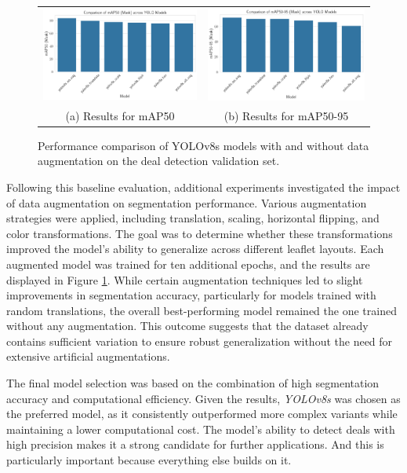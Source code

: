 \documentclass[11pt]{article}
\begin{document}
\begin{figure}[h!]
    \centering
    \begin{tabular}{cc}
    \includegraphics[width=0.5\linewidth]{figures/deal_detection/map50_yolo8.png} &   \includegraphics[width=0.5\linewidth]{figures/deal_detection/map50_95_yolo8.png} \\
    (a) Results for mAP50 & (b) Results for mAP50-95 \\[2pt]
    \end{tabular}
    \caption{Performance comparison of YOLOv8s models with and without data augmentation on the deal detection validation set.}
    \label{fig:yolo8_results}
\end{figure}

Following this baseline evaluation, additional experiments investigated the impact of data augmentation on segmentation performance. Various augmentation strategies were applied, including translation, scaling, horizontal flipping, and color transformations. The goal was to determine whether these transformations improved the model’s ability to generalize across different leaflet layouts. Each augmented model was trained for ten additional epochs, and the results are displayed in Figure \ref{fig:yolo8_results}. While certain augmentation techniques led to slight improvements in segmentation accuracy, particularly for models trained with random translations, the overall best-performing model remained the one trained without any augmentation. This outcome suggests that the dataset already contains sufficient variation to ensure robust generalization without the need for extensive artificial augmentations.

The final model selection was based on the combination of high segmentation accuracy and computational efficiency. Given the results, \emph{YOLOv8s} was chosen as the preferred model, as it consistently outperformed more complex variants while maintaining a lower computational cost. The model’s ability to detect deals with high precision makes it a strong candidate for further applications. And this is particularly important because everything else builds on it.
\end{document}
